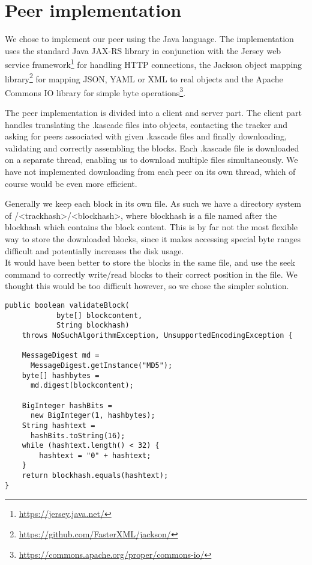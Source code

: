 \documentclass{acm_proc_article-sp}
\begin{document}

\section{Peer implementation}
We chose to implement our peer using the Java language. 
The implementation uses the standard Java JAX-RS library in conjunction with the Jersey web service framework\footnote{\url{https://jersey.java.net/}} for handling HTTP connections, the Jackson object mapping library\footnote{\url{https://github.com/FasterXML/jackson/}} for mapping JSON, YAML or XML to real objects and the Apache Commons IO library for simple byte operations\footnote{\url{https://commons.apache.org/proper/commons-io/}}. 

The peer implementation is divided into a client and server part. The client part handles translating the .kascade files into objects, contacting the tracker and asking for peers associated with given .kascade files and finally downloading, validating and correctly assembling the blocks.
Each .kascade file is downloaded on a separate thread, enabling us to download multiple files simultaneously. We have not implemented downloading from each peer on its own thread, which of course would be even more efficient.

Generally we keep each block in its own file. As such we have a directory system of /<trackhash>/<blockhash>, where blockhash is a file named after the blockhash which contains the block content. This is by far not the most flexible way to store the downloaded blocks, since it makes accessing special byte ranges difficult and potentially increases the disk usage. \\
It would have been better to store the blocks in the same file, and use the seek command to correctly write/read blocks to their correct position in the file. We thought this would be too difficult however, so we chose the simpler solution.

\begin{lstlisting}[caption=Code to validate the hashsum of a downloaded block]
public boolean validateBlock(
            byte[] blockcontent, 
            String blockhash) 
    throws NoSuchAlgorithmException, UnsupportedEncodingException {

    MessageDigest md = 
      MessageDigest.getInstance("MD5");
    byte[] hashbytes = 
      md.digest(blockcontent);

    BigInteger hashBits = 
      new BigInteger(1, hashbytes);
    String hashtext = 
      hashBits.toString(16);
    while (hashtext.length() < 32) {
        hashtext = "0" + hashtext;
    }
    return blockhash.equals(hashtext);
}
\end{lstlisting}
\end{document}
